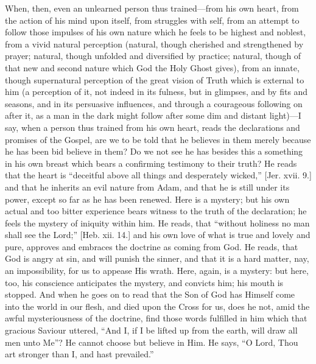 When, then, even an unlearned person thus trained—from his own
heart, from the action of his mind upon itself, from struggles with
self, from an attempt to follow those impulses of his own nature which
he feels to be highest and noblest, from a vivid natural perception
(natural, though cherished and strengthened by prayer; natural, though
unfolded and diversified by practice; natural, though of that new and
second nature which God the Holy Ghost gives), from an innate, though
supernatural perception of the great vision of Truth which is external
to him (a perception of it, not indeed in its fulness, but in
glimpses, and by fits and seasons, and in its persuasive influences,
and through a courageous following on after it, as a man in the dark
might follow after some dim and distant light)—I say, when a person
thus trained from his own heart, reads the declarations and promises
of the Gospel, are we to be told that he believes in them merely
because he has been bid believe in them? Do we not see he has besides
this a something in his own breast which bears a confirming testimony
to their truth? He reads that the heart is ``deceitful above all
things and desperately wicked,'' [Jer. xvii. 9.] and that he
inherits an evil nature from Adam, and that he is still under its
power, except so far as he has been renewed. Here is a mystery; but
his own actual and too bitter experience bears witness to the truth of
the declaration; he feels the mystery of iniquity within him. He
reads, that ``without holiness no man shall see the Lord;''
[Heb. xii. 14.] and his own love of what is true and lovely and pure,
approves and embraces the doctrine as coming from God. He reads, that
God is angry at sin, and will punish the sinner, and that it is a hard
matter, nay, an impossibility, for us to appease His wrath. Here,
again, is a mystery: but here, too, his conscience anticipates the
mystery, and convicts him; his mouth is stopped. And when he goes on
to read that the Son of God has Himself come into the world in our
flesh, and died upon the Cross for us, does he not, amid the awful
mysteriousness of the doctrine, find those words fulfilled in him
which that gracious Saviour uttered, ``And I, if I be lifted up
from the earth, will draw all men unto Me''? He cannot choose but
believe in Him. He says, ``O Lord, Thou art stronger than I, and
hast prevailed.''

